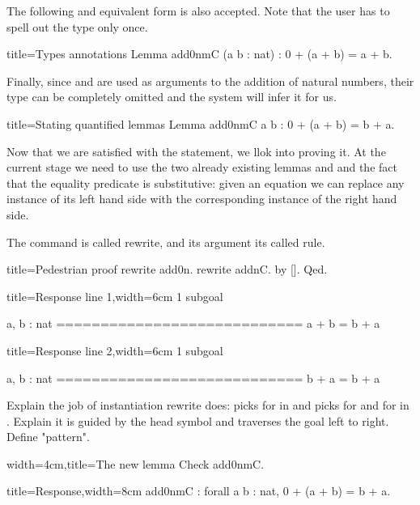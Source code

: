 The following and equivalent form is also accepted.  Note that
the user has to spell out the type only once.

\begin{coq}{title=Types annotations}
Lemma add0nmC (a b : nat) : 0 + (a + b) = a + b.
\end{coq}

Finally, since  and  are used as arguments to
the addition of natural numbers, their type can be completely
omitted and the system will infer it for us.

\begin{coq}{title=Stating quantified lemmas}
Lemma add0nmC a b : 0 + (a + b) = b + a.
\end{coq}

Now that we are satisfied with the statement, we llok into proving it.
At the current stage we need to use the two already existing
lemmas  and  and the fact that the equality predicate
is substitutive: given an equation we can replace any instance of
its left hand side with the corresponding instance of the right hand side.

The command is called rewrite, and its argument its called rule.

\begin{coq}{title=Pedestrian proof}
rewrite add0n.
rewrite addnC.
by [].
Qed.
\end{coq}

\begin{coqout}{title=Response line 1,width=6cm}
1 subgoal

  a, b : nat
  ============================
   a + b = b + a
\end{coqout}
\begin{coqout}{title=Response line 2,width=6cm}
1 subgoal

  a, b : nat
  ============================
   b + a = b + a
\end{coqout}

Explain the job of instantiation rewrite does: picks  for
 in  and picks  for  and  for  in
.  Explain it is guided by the head symbol \C{+} and traverses
the goal left to right.  Define "pattern".

\begin{coq}{width=4cm,title=The new lemma}
Check add0nmC.
\end{coq}
\begin{coqout}{title=Response,width=8cm}
add0nmC : forall a b : nat, 0 + (a + b) = b + a.
\end{coqout}

